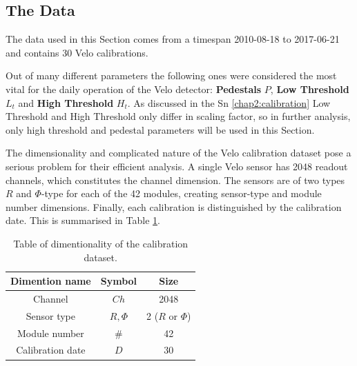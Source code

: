\subsection{The Data}

The data used in this Section comes from a timespan 2010-08-18 to 2017-06-21 and contains 30 Velo calibrations.

Out of many different parameters the following ones were considered the most vital for the daily operation of the Velo detector:
\textbf{Pedestals} $P$, \textbf{Low Threshold} $L_t$ and \textbf{High Threshold} $H_t$.
As discussed in the Sn \ref{chap2:calibration}
Low Threshold and High Threshold only differ in scaling factor, so in further analysis, only high threshold and pedestal parameters will be used in this Section.


The dimensionality and complicated nature of the Velo calibration dataset pose a serious problem for their efficient analysis.
A single Velo sensor has 2048 readout channels, which constitutes the channel dimension. The sensors are of two types $R$ and $\Phi$-type for each of the 42 modules, creating sensor-type and module number dimensions. Finally, each calibration is distinguished by the calibration date. This is summarised in Table \ref{tab:velo_dimentionality}.

\begin{table}[h]
\begin{center}
\begin{tabular}{ |c|c|c| }
\hline
Dimention name & Symbol & Size\\
\hline
Channel & $Ch$ & 2048\\
Sensor type & ${R, \Phi}$ & 2 ($R$ or $\Phi$) \\
Module number & $\#$ & 42 \\
Calibration date & $D$ & 30\\
\hline
\end{tabular}
\caption{\label{tab:velo_dimentionality}Table of dimentionality of the calibration dataset.}
\end{center}
\end{table}

